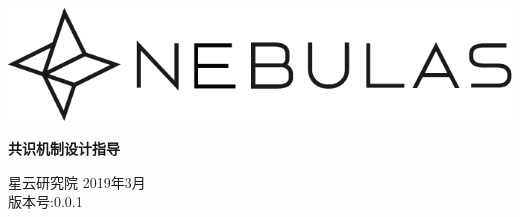 \documentclass[12pt]{article}
\begin{document}
\pagestyle{empty}
\renewcommand{\contentsname}{目录}
\renewcommand{\abstractname}{摘要}
\renewcommand{\refname}{参考文献}
\renewcommand{\figurename}{图}
\renewcommand{\tablename}{表}
\renewcommand{\baselinestretch}{1.5}
\renewcommand{\appendixname}{附录}
\renewcommand{\proofname}{证明}


\begin{titlepage}
  \begin{center}
    \vspace*{5.5cm}
    \includegraphics[scale=0.5]{../common/Nebulas.png}
    \vspace{0.5cm}


   \textbf{\huge{共识机制设计指导}}

    \vspace{0.5cm}
    星云研究院
    \vfill
    2019年3月 \\
    版本号:0.0.1
    \textbf{}
  \end{center}

\end{titlepage}
\setcounter{page}{0}

\tableofcontents
\newpage
\setcounter{page}{1}
\pagestyle{fancy}
\vspace*{0.01cm}







\newpage
\begin{appendices}




%
\end{appendices}
\newpage

\end{document}
